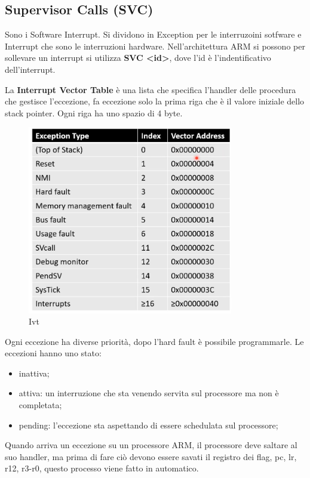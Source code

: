 \documentclass[12pt]{article}
\begin{document}
\subsection{Supervisor Calls (SVC)}
Sono i Software Interrupt. Si dividono in Exception per le interruzoini sotfware e Interrupt che sono le interruzioni hardware. Nell'architettura ARM si possono per sollevare un interrupt si utilizza \textbf{SVC <id>}, dove l'id \`e l'indentificativo dell'interrupt.

La \textbf{Interrupt Vector Table} \`e una lista che specifica l'handler delle procedura che gestisce l'eccezione, fa eccezione solo la prima riga che \`e il valore iniziale dello stack pointer. Ogni riga ha uno spazio di 4 byte.
\begin{figure}[H]
    \centering
    \includegraphics[width=0.8\textwidth]{ivt.png}
    \caption{Ivt}
    \label{fig:ivt}
\end{figure}
Ogni eccezione ha diverse priorit\`a, dopo l'hard fault \`e possibile programmarle. Le eccezioni hanno uno stato:
\begin{itemize}
    \item inattiva;
    \item attiva: un interruzione che sta venendo servita sul processore ma non \`e completata;
    \item pending: l'eccezione sta aspettando di essere schedulata sul processore;
\end{itemize}
Quando arriva un eccezione su un processore ARM, il processore deve saltare al suo handler, ma prima di fare ci\`o devono essere savati il registro dei flag, pc, lr, r12, r3-r0, questo processo viene fatto in automatico.
\end{document}
